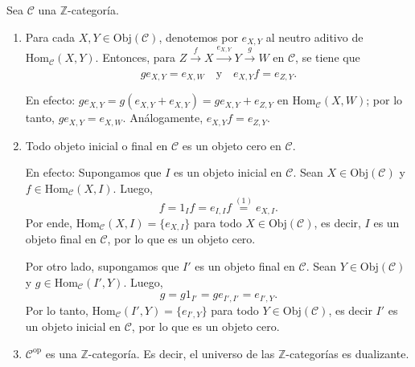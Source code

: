\documentclass[tesis]{subfiles}
\begin{document}
\begin{Obs} \label{Mendoza-1.9.1}
    Sea $\mathscr{C}$ una $\mathbb{Z}$-categoría.

    \begin{enumerate}[label=(\arabic*)]

        \item Para cada $X,Y\in\text{Obj}(\mathscr{C})$, denotemos por $e_{X,Y}$ al neutro aditivo de $\text{Hom}_\mathscr{C}(X,Y)$. Entonces, para $Z\xrightarrow[]{f}X\xrightarrow[]{e_{X,Y}}Y\xrightarrow[]{g}W$ en $\mathscr{C}$, se tiene que
            \[
            ge_{X,Y} = e_{X,W} \quad \text{y} \quad e_{X,Y}f = e_{Z,Y}.
            \] 

            En efecto: $ge_{X,Y} = g(e_{X,Y}+e_{X,Y}) = ge_{X,Y} + e_{Z,Y}$ en $\text{Hom}_\mathscr{C}(X,W)$; por lo tanto, $ge_{X,Y}=e_{X,W}$. Análogamente, $e_{X,Y}f = e_{Z,Y}$.

        \item Todo objeto inicial o final en $\mathscr{C}$ es un objeto cero en $\mathscr{C}$.

            En efecto: Supongamos que $I$ es un objeto inicial en $\mathscr{C}$. Sean $X\in\text{Obj}(\mathscr{C})$ y $f\in\text{Hom}_\mathscr{C}(X,I)$. Luego,
            \[
                f = 1_I f = e_{I,I}f \overset{(1)}{=} e_{X,I}.
            \] 
            Por ende, $\text{Hom}_\mathscr{C}(X,I) = \{e_{X,I}\}$ para todo $X\in\text{Obj}(\mathscr{C})$, es decir, $I$ es un objeto final en $\mathscr{C}$, por lo que es un objeto cero.

            Por otro lado, supongamos que $I'$ es un objeto final en $\mathscr{C}$. Sean $Y\in\text{Obj}(\mathscr{C})$ y $g\in\text{Hom}_\mathscr{C}(I',Y)$. Luego,
            \[
            g = g1_{I'} = ge_{I',I'} = e_{I',Y}.
            \] 
            Por lo tanto, $\text{Hom}_\mathscr{C}(I',Y) = \{e_{I',Y}\}$ para todo $Y\in\text{Obj}(\mathscr{C})$, es decir $I'$ es un objeto inicial en $\mathscr{C}$, por lo que es un objeto cero.

        \item $\mathscr{C}^\text{op}$ es una $\mathbb{Z}$-categoría. Es decir, el universo de las $\mathbb{Z}$-categorías es dualizante.


\end{enumerate}
\end{Obs}
\end{document}

